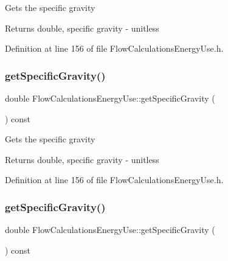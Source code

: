 Gets the specific gravity

\begin{DoxyReturn}{Returns}
double, specific gravity -\/ unitless 
\end{DoxyReturn}


Definition at line 156 of file Flow\+Calculations\+Energy\+Use.\+h.

\mbox{\label{class_flow_calculations_energy_use_adc3ac2406e00a75c33be0a6a66153da3}} 
\subsubsection{\texorpdfstring{get\+Specific\+Gravity()}{getSpecificGravity()}\hspace{0.1cm}{\footnotesize\ttfamily [2/3]}}
{\footnotesize\ttfamily double Flow\+Calculations\+Energy\+Use\+::get\+Specific\+Gravity (\begin{DoxyParamCaption}{ }\end{DoxyParamCaption}) const\hspace{0.3cm}{\ttfamily [inline]}}

Gets the specific gravity

\begin{DoxyReturn}{Returns}
double, specific gravity -\/ unitless 
\end{DoxyReturn}


Definition at line 156 of file Flow\+Calculations\+Energy\+Use.\+h.

\mbox{\label{class_flow_calculations_energy_use_adc3ac2406e00a75c33be0a6a66153da3}} 
\subsubsection{\texorpdfstring{get\+Specific\+Gravity()}{getSpecificGravity()}\hspace{0.1cm}{\footnotesize\ttfamily [3/3]}}
{\footnotesize\ttfamily double Flow\+Calculations\+Energy\+Use\+::get\+Specific\+Gravity (\begin{DoxyParamCaption}{ }\end{DoxyParamCaption}) const\hspace{0.3cm}{\ttfamily [inline]}}

